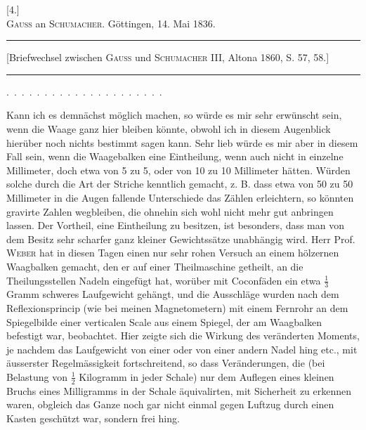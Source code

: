 \clearpage\begingroup{}
\begin{center}
[4.]\\[.7em]
\textsc{Gauss} an \textsc{Schumacher}. Göttingen, 14. Mai 1836.
\par\medskip\rule{.78\textwidth}{.35pt}\par
{\small [Briefwechsel zwischen \textsc{Gauss} und \textsc{Schumacher} III, Altona 1860, S. 57, 58.]}\par
\rule{.78\textwidth}{.35pt}
\end{center}
\noindent .\ .\ .\ .\ .\ .\ .\ .\ .\ .\ .\ .\ .\ .\ .\ .\ .\ .\ .\ .\ .
\par\noindent\hspace*{\parindent}Kann ich es demnächst möglich machen, so würde es mir sehr erwünscht
sein, wenn die Waage ganz hier bleiben könnte, obwohl ich in diesem Augenblick
hierüber noch nichts bestimmt sagen kann. Sehr lieb würde es mir
aber in diesem Fall sein, wenn die Waagebalken eine Eintheilung, wenn auch
nicht in einzelne Millimeter, doch etwa von 5 zu 5, oder von 10 zu 10 Millimeter
hätten. Würden solche durch die Art der Striche kenntlich gemacht,
z. B. dass etwa von 50 zu 50 Millimeter in die Augen fallende Unterschiede
das Zählen erleichtern, so könnten gravirte Zahlen wegbleiben, die ohnehin
sich wohl nicht mehr gut anbringen lassen. Der Vortheil, eine Eintheilung
zu besitzen, ist besonders, dass man von dem Besitz sehr scharfer ganz kleiner
Gewichtssätze unabhängig wird. Herr Prof. \textsc{Weber} hat in diesen Tagen
einen nur sehr rohen Versuch an einem hölzernen Waagbalken gemacht, den
er auf einer Theilmaschine getheilt, an die Theilungsstellen Nadeln eingefügt
hat, worüber mit Coconfäden ein etwa \(\frac{1}{3}\) Gramm schweres Laufgewicht gehängt,
und die Ausschläge wurden nach dem Reflexionsprincip (wie bei meinen
Magnetometern) mit einem Fernrohr an dem Spiegelbilde einer verticalen Scale
\clearpage{}
\noindent aus einem Spiegel, der am Waagbalken befestigt war, beobachtet. Hier zeigte
sich die Wirkung des veränderten Moments, je nachdem das Laufgewicht von
einer oder von einer andern Nadel hing etc., mit äusserster Regelmässigkeit
fortschreitend, so dass Veränderungen, die (bei Belastung von \(\frac{1}{2}\) Kilogramm
in jeder Schale) nur dem Auflegen eines kleinen Bruchs eines Milligramms
in der Schale äquivalirten, mit Sicherheit zu erkennen waren, obgleich das
Ganze noch gar nicht einmal gegen Luftzug durch einen Kasten geschützt
war, sondern frei hing.

